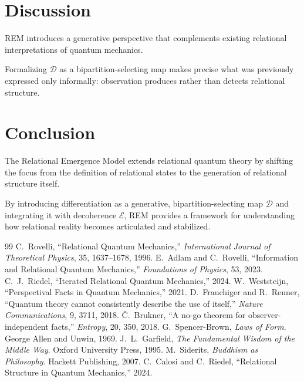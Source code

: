 \documentclass{article}
\begin{document}
\section{Discussion}
REM introduces a generative perspective that complements existing relational interpretations of quantum mechanics.

Formalizing $\mathcal{D}$ as a bipartition-selecting map makes precise what was previously expressed only informally: observation produces rather than detects relational structure.

\section{Conclusion}
The Relational Emergence Model extends relational quantum theory by shifting the focus from the definition of relational states to the generation of relational structure itself.

By introducing differentiation as a generative, bipartition-selecting map $\mathcal{D}$ and integrating it with decoherence $\mathcal{E}$, REM provides a framework for understanding how relational reality becomes articulated and stabilized.

\begin{thebibliography}{99}
 C.~Rovelli, ``Relational Quantum Mechanics,'' \textit{International Journal of Theoretical Physics}, 35, 1637--1678, 1996.
 E.~Adlam and C.~Rovelli, ``Information and Relational Quantum Mechanics,'' \textit{Foundations of Physics}, 53, 2023.
 C.~J.~Riedel, ``Iterated Relational Quantum Mechanics,'' 2024.
 W.~Weststeijn, ``Perspectival Facts in Quantum Mechanics,'' 2021.
 D.~Frauchiger and R.~Renner, ``Quantum theory cannot consistently describe the use of itself,'' \textit{Nature Communications}, 9, 3711, 2018.
 \v{C}.~Brukner, ``A no-go theorem for observer-independent facts,'' \textit{Entropy}, 20, 350, 2018.
 G.~Spencer-Brown, \textit{Laws of Form}. George Allen and Unwin, 1969.
 J.~L.~Garfield, \textit{The Fundamental Wisdom of the Middle Way}. Oxford University Press, 1995.
 M.~Siderits, \textit{Buddhism as Philosophy}. Hackett Publishing, 2007.
 C.~Calosi and C.~Riedel, ``Relational Structure in Quantum Mechanics,'' 2024.
\end{thebibliography}
\end{document}
